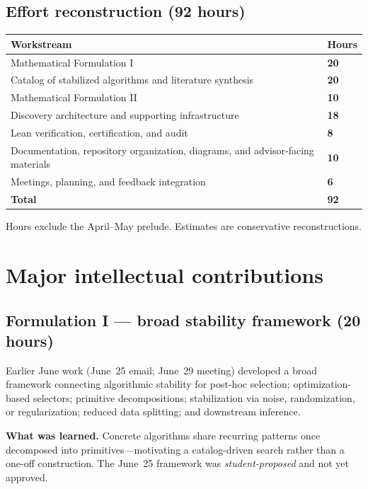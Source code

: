 \documentclass[11pt]{article}
\begin{document}
\subsection*{Effort reconstruction (92 hours)}
\noindent
\renewcommand{\arraystretch}{1.02}
\setlength{\tabcolsep}{3pt}%
\begin{tabularx}{0.995\textwidth}{@{}>{\RaggedRight\arraybackslash}X >{\centering\arraybackslash}p{1.15cm}@{}}
\toprule
\textbf{Workstream} & \textbf{Hours} \\
\midrule
\rowcolor{bluegray}
Mathematical Formulation I & \textbf{20} \\
Catalog of stabilized algorithms and literature synthesis & \textbf{20} \\
\rowcolor{bluegray}
Mathematical Formulation II & \textbf{10} \\
Discovery architecture and supporting infrastructure & \textbf{18} \\
\rowcolor{bluegray}
Lean verification, certification, and audit & \textbf{8} \\
Documentation, repository organization, diagrams, and advisor-facing materials & \textbf{10} \\
Meetings, planning, and feedback integration & \textbf{6} \\
\midrule
\textbf{Total} & \textbf{92} \\
\bottomrule
\end{tabularx}

\vspace{1pt}
{\small Hours exclude the April--May prelude. Estimates are conservative reconstructions.}

\section{Major intellectual contributions}

\subsection{Formulation I --- broad stability framework (20 hours)}
\begin{tcolorbox}[featurebox, breakable=false, title=Formulation I]
Earlier June work (June~25 email; June~29 meeting) developed a broad framework connecting
algorithmic stability for post-hoc selection; optimization-based selectors; primitive
decompositions; stabilization via noise, randomization, or regularization; reduced data
splitting; and downstream inference.

\textbf{What was learned.} Concrete algorithms share recurring patterns once decomposed into
primitives---motivating a catalog-driven search rather than a one-off construction.
The June~25 framework was \emph{student-proposed} and not yet approved.
\end{tcolorbox}
\end{document}
